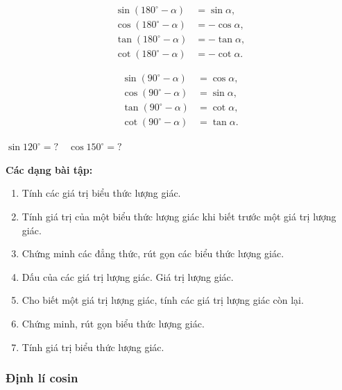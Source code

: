 \documentclass[12pt,a4paper]{article}
\begin{document}
\begin{congthuc}[title={Góc bù nhau (sin - bù)}]
  \begin{align}
    \sin(180^\circ - \alpha) &= \sin\alpha, \\
    \cos(180^\circ - \alpha) &= -\cos\alpha, \\
    \tan(180^\circ - \alpha) &= -\tan\alpha, \\
    \cot(180^\circ - \alpha) &= -\cot\alpha.
  \end{align}
\end{congthuc}

\begin{congthuc}[title={Góc phụ nhau (phụ chéo)}]
  \begin{align}
    \sin(90^\circ - \alpha) &= \cos\alpha, \\
    \cos(90^\circ - \alpha) &= \sin\alpha, \\
    \tan(90^\circ - \alpha) &= \cot\alpha, \\
    \cot(90^\circ - \alpha) &= \tan\alpha.
  \end{align}
\end{congthuc}

\begin{vidu}
  $\sin 120^\circ = ?\quad \cos 150^\circ = ?$
\end{vidu}

\medskip\noindent\textbf{Các dạng bài tập:}
\begin{enumerate}[label=\textbf{Dạng \arabic*:}, leftmargin=*, align=left]
  \item Tính các giá trị biểu thức lượng giác.
  \item Tính giá trị của một biểu thức lượng giác khi biết trước một giá trị lượng giác.
  \item Chứng minh các đẳng thức, rút gọn các biểu thức lượng giác.
  \item Dấu của các giá trị lượng giác. Giá trị lượng giác.
  \item Cho biết một giá trị lượng giác, tính các giá trị lượng giác còn lại.
  \item Chứng minh, rút gọn biểu thức lượng giác.
  \item Tính giá trị biểu thức lượng giác.
\end{enumerate}

\subsubsection{Định lí cosin}
\end{document}
